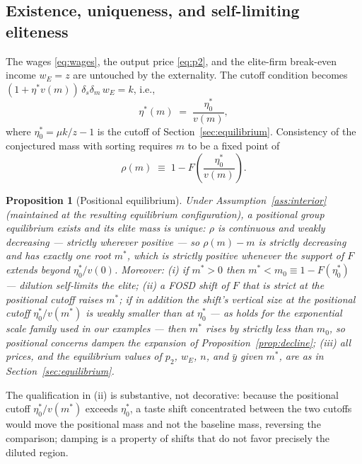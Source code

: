 \documentclass[12pt,letterpaper]{article}
\newtheorem{proposition}{Proposition}
\theoremstyle{definition}
\begin{document}
\subsection{Existence, uniqueness, and self-limiting eliteness}

The wages \eqref{eq:wages}, the output price \eqref{eq:p2}, and the elite-firm break-even income $w_E=z$ are untouched by the externality.
The cutoff condition becomes $(1+\eta^\ast v(m))\,\delta_s\delta_m\, w_E = k$, i.e.,
\begin{equation}\label{eq:positional-cutoff}
  \eta^\ast(m) \;=\; \frac{\eta^\ast_0}{v(m)},
\end{equation}
where $\eta^\ast_0 = \mu k/z - 1$ is the cutoff of Section~\ref{sec:equilibrium}.
Consistency of the conjectured mass with sorting requires $m$ to be a fixed point of
\begin{equation}\label{eq:fixedpoint}
  \rho(m) \;\equiv\; 1 - F\!\left(\frac{\eta^\ast_0}{v(m)}\right).
\end{equation}

\begin{proposition}[Positional equilibrium]\label{prop:positional} Under Assumption~\ref{ass:interior} (maintained at the resulting equilibrium configuration), a positional group equilibrium exists and its elite mass is unique: $\rho$ is continuous and weakly decreasing --- strictly wherever positive --- so $\rho(m)-m$ is strictly decreasing and has exactly one root $m^\ast$, which is strictly positive whenever the support of $F$ extends beyond $\eta^\ast_0/v(0)$.
Moreover: (i) if $m^\ast>0$ then $m^\ast < m_0 \equiv 1-F(\eta^\ast_0)$ --- dilution self-limits the elite; (ii) a FOSD shift of $F$ that is strict at the positional cutoff raises $m^\ast$; if in addition the shift's vertical size at the positional cutoff $\eta^\ast_0/v(m^\ast)$ is weakly smaller than at $\eta^\ast_0$ --- as holds for the exponential scale family used in our examples --- then $m^\ast$ rises by strictly less than $m_0$, so positional concerns dampen the expansion of Proposition~\ref{prop:decline}; (iii) all prices, and the equilibrium values of $p_2$, $w_E$, $n$, and $\bar{y}$ given $m^\ast$, are as in Section~\ref{sec:equilibrium}.
\end{proposition}

The qualification in (ii) is substantive, not decorative: because the positional cutoff $\eta^\ast_0/v(m^\ast)$ exceeds $\eta^\ast_0$, a taste shift concentrated between the two cutoffs would move the positional mass and not the baseline mass, reversing the comparison; damping is a property of shifts that do not favor precisely the diluted region.
\end{document}
